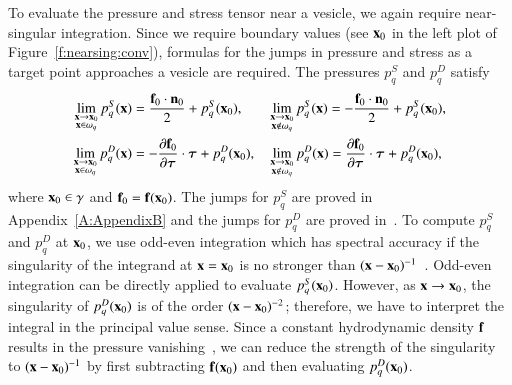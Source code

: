 To evaluate the pressure and stress tensor near a vesicle, we again
require near-singular integration.  Since we require boundary values
(see ${\mathbf{x}}_{0}$ in the left plot of Figure~\ref{f:nearsing:conv}),
formulas for the jumps in pressure and stress as a target point
approaches a vesicle are required.  The pressures $p_{q}^{S}$ and
$p_{q}^{D}$ satisfy
\begin{align*}
  \lim_{\substack{{\mathbf{x}} \rightarrow {\mathbf{x}}_{0} \\ {\mathbf{x}} \in \omega_{q}}} p^{S}_{q}({\mathbf{x}}) &= 
   \frac{{\mathbf{f}}_{0} \cdot {\mathbf{n}}_{0}}{2} + p^{S}_{q}({\mathbf{x}}_{0}), 
  &&\lim_{\substack{{\mathbf{x}} \rightarrow {\mathbf{x}}_{0} \\ {\mathbf{x}} \notin \omega_{q}}} p^{S}_{q}({\mathbf{x}}) = 
   -\frac{{\mathbf{f}}_{0} \cdot {\mathbf{n}}_{0}}{2} + p^{S}_{q}({\mathbf{x}}_{0}), \\
  \lim_{\substack{{\mathbf{x}} \rightarrow {\mathbf{x}}_{0} \\ {\mathbf{x}} \in \omega_{q}}} p^{D}_{q}({\mathbf{x}}) &= 
    -\frac{\partial {\mathbf{f}}_{0}}{\partial {\boldsymbol\tau}} \cdot {\boldsymbol\tau} + p^{D}_{q}({\mathbf{x}}_{0}), 
  &&\lim_{\substack{{\mathbf{x}} \rightarrow {\mathbf{x}}_{0} \\ {\mathbf{x}} \notin \omega_{q}}} p^{D}_{q}({\mathbf{x}}) = 
    \frac{\partial {\mathbf{f}}_{0}}{\partial {\boldsymbol\tau}} \cdot {\boldsymbol\tau} + p^{D}_{q}({\mathbf{x}}_{0}),
\end{align*}
where ${\mathbf{x}}_{0} \in \gamma$ and ${\mathbf{f}}_{0} = {\mathbf{f}}({\mathbf{x}}_{0})$.  The jumps for
$p_{q}^{S}$ are proved in Appendix~\ref{A:AppendixB} and the jumps for
$p_{q}^{D}$ are proved in~\cite{ying-biros-zorin06}.  To compute
$p_{q}^{S}$ and $p_{q}^{D}$ at ${\mathbf{x}}_{0}$, we use odd-even integration
which has spectral accuracy if the singularity of the integrand at
${\mathbf{x}}={\mathbf{x}}_{0}$ is no stronger than $({\mathbf{x}} -
{\mathbf{x}}_{0})^{-1}$~\cite{sid:isr}.  Odd-even integration can be directly
applied to evaluate $p_{q}^{S}({\mathbf{x}}_{0})$.  However, as ${\mathbf{x}} \rightarrow
{\mathbf{x}}_{0}$, the singularity of $p_{q}^{D}({\mathbf{x}}_{0})$ is of the order
$({\mathbf{x}} - {\mathbf{x}}_{0})^{-2}$; therefore, we have to interpret the integral in
the principal value sense.  Since a constant hydrodynamic density ${\mathbf{f}}$
results in the pressure vanishing~\cite{kress,pozrikidis1992}, we can
reduce the strength of the singularity to $({\mathbf{x}} - {\mathbf{x}}_{0})^{-1}$ by
first subtracting ${\mathbf{f}}({\mathbf{x}}_{0})$ and then evaluating
$p^{D}_{q}({\mathbf{x}}_{0})$.

